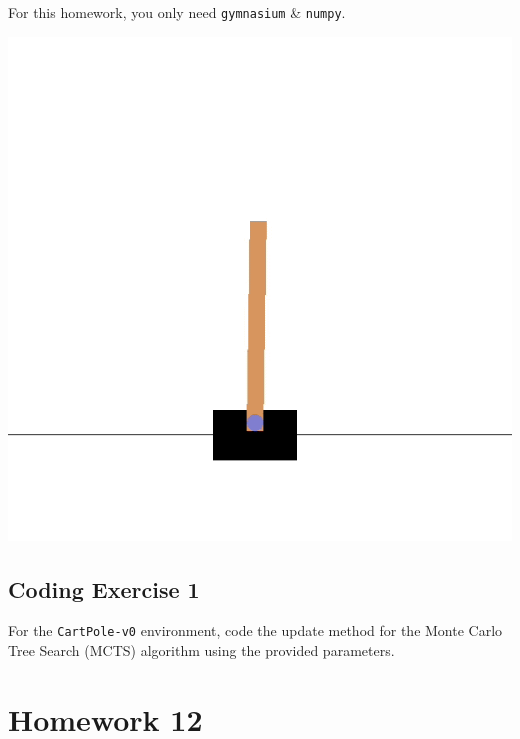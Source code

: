 \documentclass[
  letterpaper,
  DIV=11,
  numbers=noendperiod]{scrreprt}
\makeatletter
\newcommand*\pandocbounded[1]{%
  \sbox\pandoc@box{#1}%
  \Gscale@div\@tempa{\textheight}{\dimexpr\ht\pandoc@box+\dp\pandoc@box\relax}%
  \Gscale@div\@tempb{\linewidth}{\wd\pandoc@box}%
  \ifdim\@tempb\p@<\@tempa\p@\let\@tempa\@tempb\fi%
  \ifdim\@tempa\p@<\p@\scalebox{\@tempa}{\usebox\pandoc@box}%
  \else\usebox{\pandoc@box}%
  \fi%
}
\makeatother
\begin{document}
\begin{tcolorbox}[enhanced jigsaw, toprule=.15mm, leftrule=.75mm, coltitle=black, left=2mm, opacityback=0, titlerule=0mm, arc=.35mm, toptitle=1mm, opacitybacktitle=0.6, bottomtitle=1mm, colframe=quarto-callout-note-color-frame, title=\textcolor{quarto-callout-note-color}{\faInfo}\hspace{0.5em}{Note}, rightrule=.15mm, bottomrule=.15mm, colbacktitle=quarto-callout-note-color!10!white, breakable, colback=white]

For this homework, you only need \texttt{gymnasium} \& \texttt{numpy}.

\end{tcolorbox}

\begin{center}
\includegraphics[width=0.4\linewidth,height=\textheight,keepaspectratio]{homework/images/cartpole.gif}
\end{center}

\section{Coding Exercise 1}\label{coding-exercise-1-8}

For the \texttt{CartPole-v0} environment, code the update method for the
Monte Carlo Tree Search (MCTS) algorithm using the provided parameters.

\section{\texorpdfstring{\href{https://colab.research.google.com/drive/1Y_A4uKoSmjc6EmU-Or7tbeo3fe_ZD4RH?usp=sharing}{\protect\pandocbounded{}}}{}}\label{section-9}

\chapter{Homework 12}\label{homework-12}
\end{document}
